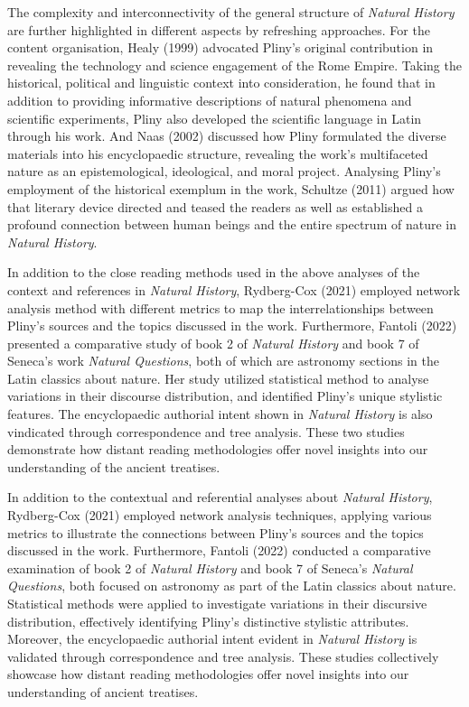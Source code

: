\documentclass[
  12pt,
]{article}
\begin{document}
The complexity and interconnectivity of the general structure of
\emph{Natural History} are further highlighted in different aspects by
refreshing approaches. For the content organisation, Healy (1999)
advocated Pliny's original contribution in revealing the technology and
science engagement of the Rome Empire. Taking the historical, political
and linguistic context into consideration, he found that in addition to
providing informative descriptions of natural phenomena and scientific
experiments, Pliny also developed the scientific language in Latin
through his work. And Naas (2002) discussed how Pliny formulated the
diverse materials into his encyclopaedic structure, revealing the work's
multifaceted nature as an epistemological, ideological, and moral
project. Analysing Pliny's employment of the historical exemplum in the
work, Schultze (2011) argued how that literary device directed and
teased the readers as well as established a profound connection between
human beings and the entire spectrum of nature in \emph{Natural
History}.

In addition to the close reading methods used in the above analyses of
the context and references in \emph{Natural History}, Rydberg-Cox (2021)
employed network analysis method with different metrics to map the
interrelationships between Pliny's sources and the topics discussed in
the work. Furthermore, Fantoli (2022) presented a comparative study of
book 2 of \emph{Natural History} and book 7 of Seneca's work
\emph{Natural Questions}, both of which are astronomy sections in the
Latin classics about nature. Her study utilized statistical method to
analyse variations in their discourse distribution, and identified
Pliny's unique stylistic features. The encyclopaedic authorial intent
shown in \emph{Natural History} is also vindicated through
correspondence and tree analysis. These two studies demonstrate how
distant reading methodologies offer novel insights into our
understanding of the ancient treatises.

In addition to the contextual and referential analyses about
\emph{Natural History}, Rydberg-Cox (2021) employed network analysis
techniques, applying various metrics to illustrate the connections
between Pliny's sources and the topics discussed in the work.
Furthermore, Fantoli (2022) conducted a comparative examination of book
2 of \emph{Natural History} and book 7 of Seneca's \emph{Natural
Questions}, both focused on astronomy as part of the Latin classics
about nature. Statistical methods were applied to investigate variations
in their discursive distribution, effectively identifying Pliny's
distinctive stylistic attributes. Moreover, the encyclopaedic authorial
intent evident in \emph{Natural History} is validated through
correspondence and tree analysis. These studies collectively showcase
how distant reading methodologies offer novel insights into our
understanding of ancient treatises.
\end{document}
